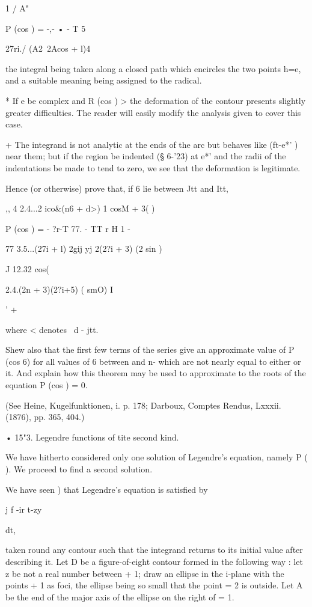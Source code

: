 {{1 / A"

P (cos ) = -,- • - T 5

27ri./ (A2\ 2Acos + l)4

the integral being taken along a closed path which encircles the two
points h=e, and a suitable meaning being assigned to the radical.

* If e be complex and R (cos ) > the deformation of the contour
presents slightly greater difficulties. The reader will easily modify
the analysis given to cover this case.

+ The integrand is not analytic at the ends of the arc but behaves
like (ft-e*' )~ near them; but if the region be indented (§ 6-'23) at
e*' and the radii of the indentations be made to tend to zero, we see
that the deformation is legitimate.

%
%

Hence (or otherwise) prove that, if 6 lie between Jtt and Itt,

,, 4 2.4...2 ico\&(n6 + d>) 1 cosM + 3( )\

P (cos ) = - ?r-T 77. - TT r H 1 -

77 3.5...(27i + l) 2gij yj 2(2?i + 3) (2 sin )

J 12.32 cos(%

2.4.(2n + 3)(2?i+5) ( smO) I

' +

where < denotes \ d - jtt.

Shew also that the first few terms of the series give an approximate
value of P (cos 6) for all values of 6 between and n- which are not
nearly equal to either or it. And explain how this theorem may be used
to approximate to the roots of the equation P (cos ) = 0.

(See Heine, Kugelfunktionen, i. p. 178; Darboux, Comptes Rendus,
Lxxxii. (1876), pp. 365, 404.)

• 15"3. Legendre functions of tite second kind.

We have hitherto considered only one solution of Legendre's equation,
namely P ( ). We proceed to find a second solution.

We have seen ) that Legendre's equation is satisfied by

j f -ir t-zy

dt,

taken round any contour such that the integrand returns to its initial
value after describing it. Let D be a figure-of-eight contour formed
in the following way : let z be not a real number between + 1; draw
an ellipse in the i-plane with the points + 1 as foci, the ellipse
being so small that the point = 2 is outside. Let A be the end of the
major axis of the ellipse on the right of = 1.

}}

